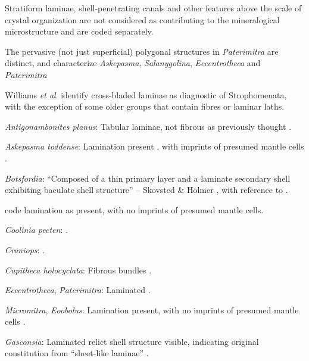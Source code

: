 \documentclass[openany]{book}
\begin{document}
Stratiform laminae, shell-penetrating canals and other features above
the scale of crystal organization are not considered as contributing to
the mineralogical microstructure and are coded separately.

The pervasive (not just superficial) polygonal structures in
\emph{Paterimitra} are distinct, and characterize \emph{Askepasma},
\emph{Salanygolina}, \emph{Eccentrotheca} and \emph{Paterimitra}
\citep{Larsson2014iPaterimitra}

Williams \emph{et al}.
\citeyearpar{Williams2000LinguliformeaCraniiformea} identify
cross-bladed laminae as diagnostic of Strophomenata, with the exception
of some older groups that contain fibres or laminar laths.

\hypertarget{Antigonambonites_planus-coding-133}{}
\emph{Antigonambonites planus}: Tabular laminae, not fibrous as
previously thought \citep{Madison2017Laminarshell}.

\hypertarget{Askepasma_toddense-coding-133}{}
\emph{Askepasma toddense}: Lamination present
\citep{Balthasar2009Homologousskeletal}, with imprints of presumed
mantle cells \citep[following][appendix 2]{Williams1998Thediversity}.

\hypertarget{Botsfordia-coding-133}{}
\emph{Botsfordia}: ``Composed of a thin primary layer and a laminate
secondary shell exhibiting baculate shell structure'' -- Skovsted \&
Holmer \citeyearpar{Skovsted2005EarlyCambrian}, with reference to
\citet{Skovsted2003EarlyCambrian}.

\citet[appendix 2]{Williams1998Thediversity} code lamination as present,
with no imprints of presumed mantle cells.

\hypertarget{Coolinia_pecten-coding-133}{}
\emph{Coolinia pecten}: \citet{Dewing2004}.

\hypertarget{Craniops-coding-133}{}
\emph{Craniops}: \citep[fig. 249.1]{Williams1997Introduction}.

\hypertarget{Cupitheca_holocyclata-coding-133}{}
\emph{Cupitheca holocyclata}: Fibrous bundles \citep{Vendrasco2017}.

\hypertarget{Eccentrotheca-coding-133}{}
\emph{Eccentrotheca}, \emph{Paterimitra}: Laminated
\citep{Balthasar2009Homologousskeletal}.

\hypertarget{Eoobolus-coding-133}{}
\emph{Micromitra}, \emph{Eoobolus}: Lamination present, with no imprints
of presumed mantle cells \citep[following][appendix
2]{Williams1998Thediversity}.

\hypertarget{Gasconsia-coding-133}{}
\emph{Gasconsia}: Laminated relict shell structure visible, indicating
original constitution from ``sheet-like laminae''
\citep{Hanken1985Thetaxonomy}.
\end{document}
